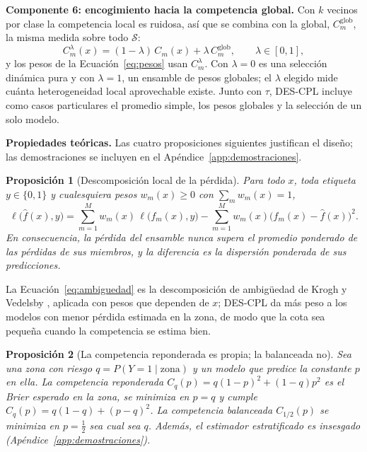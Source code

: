 \documentclass[pdflatex,sn-mathphys-num]{sn-jnl}
\theoremstyle{plain}
\newtheorem{proposicion}{Proposición}
\begin{document}
\textbf{Componente 6: encogimiento hacia la competencia global.} Con $k$ vecinos por clase la competencia local es ruidosa, así que se combina con la global, $C^{\text{glob}}_m$, la misma medida sobre todo $\mathcal{S}$:
\begin{equation}
C^{\lambda}_m(x) = (1-\lambda)\, C_m(x) + \lambda\, C^{\text{glob}}_m, \qquad \lambda\in[0,1],
\label{eq:encogimiento}
\end{equation}
y los pesos de la Ecuación~\eqref{eq:pesos} usan $C^{\lambda}_m$. Con $\lambda=0$ es una selección dinámica pura y con $\lambda=1$, un ensamble de pesos globales; el $\lambda$ elegido mide cuánta heterogeneidad local aprovechable existe. Junto con $\tau$, DES-CPL incluye como casos particulares el promedio simple, los pesos globales y la selección de un solo modelo.

\textbf{Propiedades teóricas.} Las cuatro proposiciones siguientes justifican el diseño; las demostraciones se incluyen en el Apéndice~\ref{app:demostraciones}.

\begin{proposicion}[Descomposición local de la pérdida]\label{prop:cota}
Para todo $x$, toda etiqueta $y\in\{0,1\}$ y cualesquiera pesos $w_m(x)\geq 0$ con $\sum_m w_m(x)=1$,
\begin{equation}
\ell\big(\hat{f}(x), y\big) = \sum_{m=1}^{M} w_m(x)\,\ell\big(f_m(x), y\big) - \sum_{m=1}^{M} w_m(x)\big(f_m(x)-\hat{f}(x)\big)^2 .
\label{eq:ambiguedad}
\end{equation}
En consecuencia, la pérdida del ensamble nunca supera el promedio ponderado de las pérdidas de sus miembros, y la diferencia es la dispersión ponderada de sus predicciones.
\end{proposicion}

La Ecuación~\eqref{eq:ambiguedad} es la descomposición de ambigüedad de Krogh y Vedelsby \cite{bib_krogh_1995}, aplicada con pesos que dependen de $x$; DES-CPL da más peso a los modelos con menor pérdida estimada en la zona, de modo que la cota sea pequeña cuando la competencia se estima bien.

\begin{proposicion}[La competencia reponderada es propia; la balanceada no]\label{prop:propia}
Sea una zona con riesgo $q=P(Y=1\mid\text{zona})$ y un modelo que predice la constante $p$ en ella. La competencia reponderada $C_q(p)=q(1-p)^2+(1-q)p^2$ es el Brier esperado en la zona, se minimiza en $p=q$ y cumple $C_q(p)=q(1-q)+(p-q)^2$. La competencia balanceada $C_{1/2}(p)$ se minimiza en $p=\tfrac{1}{2}$ sea cual sea $q$. Además, el estimador estratificado es insesgado (Apéndice~\ref{app:demostraciones}).
\end{proposicion}
\end{document}

